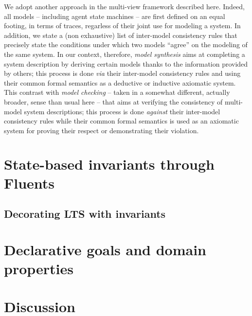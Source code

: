 We adopt another approach in the multi-view framework described here. Indeed, all models -- including agent state machines -- are first defined on an equal footing, in terms of traces, regarless of their joint use for modeling a system. In addition, we state a (non exhaustive) list of inter-model consistency rules that precisely state the conditions under which two models ``agree'' on the modeling of the same system. In our context, therefore, \emph{model synthesis} aims at completing a system description by deriving certain models thanks to the information provided by others; this process is done \emph{via} their inter-model consistency rules and using their common formal semantics as a deductive or inductive axiomatic system. This contrast with \emph{model checking} -- taken in a somewhat different, actually broader, sense than usual here -- that aims at verifying the consistency of multi-model system descriptions; this process is done \emph{against} their inter-model consistency rules while their common formal semantics is used as an axiomatic system for proving their respect or demonstrating their violation.





\section{State-based invariants through Fluents}

\subsection{Decorating LTS with invariants}

\section{Declarative goals and domain properties}

\section{Discussion\label{section:background-discussion}}

